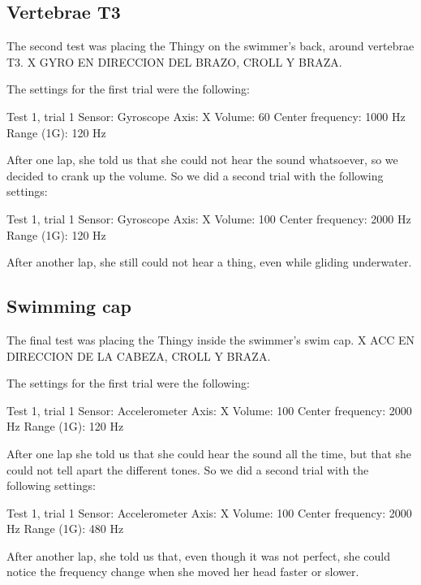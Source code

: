 \subsection{Vertebrae T3}

The second test was placing the Thingy on the swimmer's back, around vertebrae T3. X GYRO EN DIRECCION DEL BRAZO, CROLL Y BRAZA.

The settings for the first trial were the following:
\begin{settings}{Test 1, trial 1}
Sensor: 					Gyroscope
Axis: 					X
Volume:					60%
Center frequency: 	1000 Hz
Range (1G):				120 Hz
\end{settings}

After one lap, she told us that she could not hear the sound whatsoever, so we decided to crank up the volume. So we did a second trial with the following settings:

\begin{settings}{Test 1, trial 1}
Sensor: 					Gyroscope
Axis: 					X
Volume:					100%
Center frequency: 	2000 Hz
Range (1G):				120 Hz
\end{settings}

After another lap, she still could not hear a thing, even while gliding underwater.
\subsection{Swimming cap}
The final test was placing the Thingy inside the swimmer's swim cap. X ACC EN DIRECCION DE LA CABEZA, CROLL Y BRAZA.

The settings for the first trial were the following:
\begin{settings}{Test 1, trial 1}
Sensor: 					Accelerometer
Axis: 					X
Volume:					100%
Center frequency: 	2000 Hz
Range (1G):				120 Hz
\end{settings}


After one lap she told us that she could hear the sound all the time, but that she could not tell apart the different tones. So we did a second trial with the following settings:
\begin{settings}{Test 1, trial 1}
Sensor: 					Accelerometer
Axis: 					X
Volume:					100%
Center frequency: 	2000 Hz
Range (1G):				480 Hz
\end{settings}


After another lap, she told us that, even though it was not perfect, she could notice the frequency change when she moved her head faster or slower.

